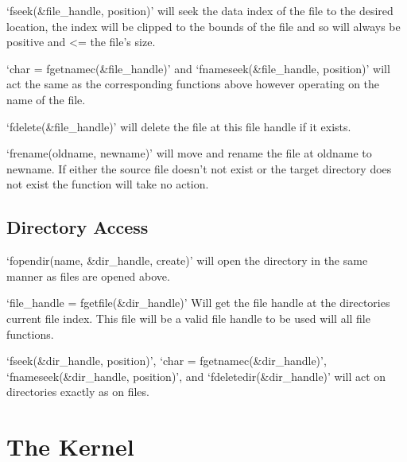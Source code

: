 \documentclass[a4paper]{report}
\begin{document}
\vspace{1.5mm}
\noindent
`fseek(\&file\_handle, position)' will seek the data index of the file to the desired location, the index will be clipped to the bounds of the file and so will always be positive and \textless = the file's size.

\vspace{1.5mm}
\noindent
`char = fgetnamec(\&file\_handle)' and `fnameseek(\&file\_handle, position)' will act the same as the corresponding functions above however operating on the name of the file.

\vspace{1.5mm}
\noindent
`fdelete(\&file\_handle)' will delete the file at this file handle if it exists.

\vspace{1.5mm}
\noindent
`frename(oldname, newname)' will move and rename the file at oldname to newname. If either the source file doesn't not exist or the target directory does not exist the function will take no action.


\subsection{Directory Access}

\vspace{1.5mm}
\noindent
`fopendir(name, \&dir\_handle, create)' will open the directory in the same manner as files are opened above.


\vspace{1.5mm}
\noindent
`file\_handle = fgetfile(\&dir\_handle)' Will get the file handle at the directories current file index. This file will be a valid file handle to be used will all file functions.

\vspace{1.5mm}
\noindent
`fseek(\&dir\_handle, position)', `char = fgetnamec(\&dir\_handle)', `fnameseek(\&dir\_handle, position)', and `fdeletedir(\&dir\_handle)' will act on directories exactly as on files.























\section{The Kernel}
\end{document}

